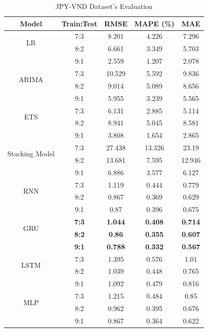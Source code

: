 \documentclass{ieeeojies}
\begin{document}
\begin{table}[H]
    \centering
    \begin{tabular}{|c|c|c|c|c|}
         \hline
         \centering Model & Train:Test & RMSE & MAPE (\%) & MAE\\
         \hline
         \multirow{2}{*}{LR} & 7:3 & 8.201 & 4.226 & 7.296 \\ & 8:2 & 6.661	& 3.349	& 5.703 \\&9:1 & 2.559	&1.207	&2.078 \\
         \hline
         \multirow{2}{*}{ARIMA} & 7:3 & 10.529 & 5.592 & 9.836 \\ & 8:2 & 9.014 & 5.089 & 8.656 \\& 9:1& 5.955 &3.239&5.565 \\
         \hline
         \multirow{2}{*}{ETS} & 7:3 & 6.131 & 2.885 & 5.114 \\ & 8:2 & 8.941 & 5.045 & 8.581 \\& 9:1 & 3.808 & 1.654 & 2.865 \\
         \hline
         \multirow{2}{*}{Stacking Model} & 7:3 & 27.438	&13.326	&23.19 \\& 8:2 &13.681	&7.595&	12.946\\ & 9:1&6.886 &3.577 &6.127\\
         \hline
         \multirow{2}{*}{RNN} & 7:3 & 1.119 & 0.444 &0.779 \\ &8:2 & 0.867 &0.369 & 0.629 \\ & 9:1 & 0.87 & 0.396 & 0.675 \\
         \hline
         \multirow{2}{*}{GRU} & \textbf{7:3} & \textbf{1.044} & \textbf{0.408} & \textbf{0.714} \\ & \textbf{8:2} & \textbf{0.86} & \textbf{0.355} & \textbf{0.607} \\ &\textbf{9:1} &\textbf{0.788}& \textbf{0.332} & \textbf{0.567} \\
         \hline
         \multirow{2}{*}{LSTM} & 7:3 & 1.395 &0.576& 1.01 \\& 8:2 &1.039 &0.448 &0.765 \\ &9:1 &1.092& 0.479& 0.816\\
         \hline
         \multirow{2}{*}{MLP} & 7:3 &1.215 &0.484 &0.85 \\ &8:2 &0.962& 0.395 &0.676\\ & 9:1 &0.867 &0.364 &0.622 \\
         \hline
    \end{tabular}
    \caption{JPY-VND Dataset's Evaluation}
    \label{mbbresult}
\end{table}
\end{document}
